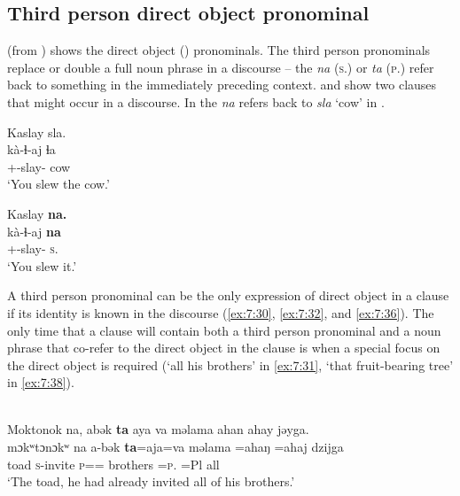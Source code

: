 \subsection{Third person direct object pronominal}\label{sec:7.3.2}
\hypertarget{RefHeading1212181525720847}{}
 (from \citealt{FriesenMamalis2008}) shows the direct object (\DO) pronominals. The third person \DO pronominals replace or double a full noun phrase in a discourse -- the \textit{na} (\textsc{s}.{\DO}) or \textit{ta} (\textsc{p}.{\DO}) refer back to something in the immediately preceding context.  and  show two clauses that might occur in a discourse. In  the \textit{na} refers back to \textit{sla} ‘cow’ in .

\ea\label{ex:7:29}
Kaslay  sla.   \\   
\gll kà-ɬ{}-aj    ɬa  \\    
{\twoS}+{\PFV}-slay{}-{\CL}  cow  \\       
\glt ‘You slew the cow.’            
\z

\ea\label{ex:7:30}
Kaslay  \textbf{na}\textbf{.}\\
\gll kà-ɬ{}-aj     \textbf{na}\\
{\twoS}+{\PFV}-slay{}-{\CL}    \textsc{s}.{\DO}  \\
\glt ‘You slew it.’
\z

A third person \DO pronominal can be the only expression of direct object in a clause if its identity is known in the discourse (\ref{ex:7:30}, \ref{ex:7:32}, and \ref{ex:7:36}). The only time that a clause will contain both a third person \DO pronominal and a noun phrase that co-refer to the direct object in the clause is when a special focus on the direct object is required (‘all his brothers’ in \ref{ex:7:31}, ‘that fruit-bearing tree’ in \ref{ex:7:38}). 


\ea\label{ex:7:31}\\
Moktonok  na,  abək  \textbf{ta}  aya  va  məlama  ahan  ahay  jəyga.\\
\gll mɔkʷtɔnɔkʷ na  a-bək       \textbf{ta}=aja=va  məlama  =ahaŋ    =ahaj  dzijga\\
toad    {\PSP}  \textsc{s}-invite  \textsc{p}={\PLU}={\PRF}  brothers  =\textsc{p}.{\POSS}  =Pl  all\\
\glt ‘The toad, he had already invited all of his brothers.’  
\z

